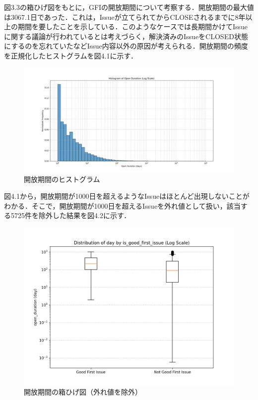 \documentclass[11pt]{jreport}
\begin{document}
図3.3の箱ひげ図をもとに，GFIの開放期間について考察する．開放期間の最大値は3067.1日であった．これは，Issueが立てられてからCLOSEされるまでに8年以上の期間を要したことを示している．このようなケースでは長期間かけてIssueに関する議論が行われているとは考えづらく，解決済みのIssueをCLOSED状態にするのを忘れていたなどIssue内容以外の原因が考えられる．開放期間の頻度を正規化したヒストグラムを図4.1に示す．

\begin{figure}[H]
\centerline{\includegraphics[width=0.9\linewidth]{@BSthesis2024_Nakai/BSthesis2024_Nakai_fig/time_hist.png}}
\caption{開放期間のヒストグラム}
\label{fig:milestone}
\end{figure}

図4.1から，開放期間が1000日を超えるようなIssueはほとんど出現しないことがわかる．そこで，開放期間が1000日を超えるIssueを外れ値として扱い，該当する5725件を除外した結果を図4.2に示す．

\begin{figure}[H]
\centerline{\includegraphics[width=0.9\linewidth]{@BSthesis2024_Nakai/BSthesis2024_Nakai_fig/true_time_box.png}}
\caption{開放期間の箱ひげ図（外れ値を除外）}
\label{fig:milestone}
\end{figure}
\end{document}
